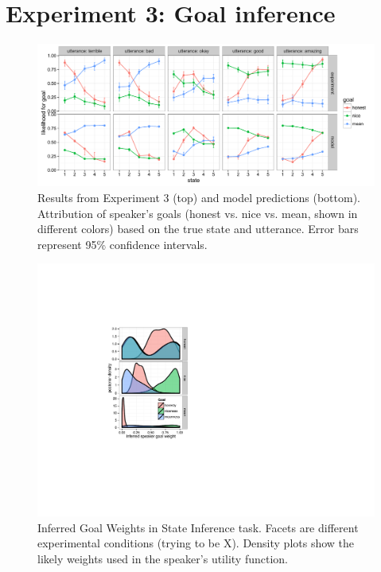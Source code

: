 \documentclass[10pt,letterpaper]{article}
\begin{document}
\section{Experiment 3: Goal inference}


\begin{figure}[!t]
\begin{center}
  \includegraphics[width=\textwidth]{figures/exp2.pdf}
  \caption{\label{fig:exp2} Results from Experiment 3 (top) and model predictions (bottom). Attribution of speaker's goals (honest vs. nice vs. mean, shown in different colors) based on the true state and utterance. Error bars represent 95\% confidence intervals.}
  \end{center}
\end{figure}
\begin{figure}[!b] %
\begin{centering}
\includegraphics[width=0.70\columnwidth]{figures/goal-posterior.pdf}
\caption{\label{fig:goal-priors-bda} Inferred Goal Weights in State Inference task.
Facets are different experimental conditions (trying to be X). Density plots show the likely weights used in the speaker's utility function.
}
\end{centering}
\end{figure}
\end{document}

